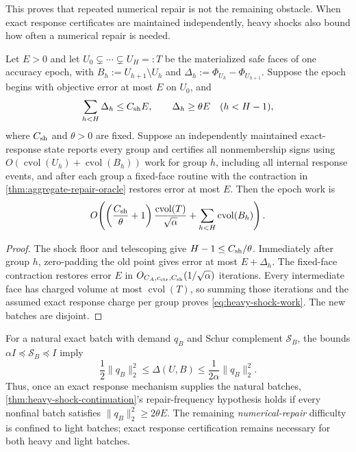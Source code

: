 This proves that repeated numerical repair is not the remaining obstacle.
When exact response certificates are maintained independently, heavy shocks
also bound how often a numerical repair is needed.

\begin{theorem}
\label{thm:heavy-shock-continuation}
Let $E>0$ and let
$U_0\subsetneq\cdots\subsetneq U_H=:T$ be the materialized safe faces of one
accuracy epoch, with $B_h:=U_{h+1}\setminus U_h$ and
$\Delta_h:=\Phi_{U_h}-\Phi_{U_{h+1}}$.  Suppose the epoch begins with
objective error at most $E$ on $U_0$, and
\begin{equation}
 \sum_{h<H}\Delta_h\leq C_{\rm sh}E,
 \qquad
 \Delta_h\geq\theta E\quad(h<H-1),
 \label{eq:heavy-shock-groups}
\end{equation}
where $C_{\rm sh}$ and $\theta>0$ are fixed.  Suppose an independently
maintained exact-response state reports every group and certifies all
nonmembership signs using
$O(\operatorname{cvol}(U_h)+\operatorname{cvol}(B_h))$ work for group $h$,
including all internal response events, and after each group a fixed-face
routine with the contraction in \cref{thm:aggregate-repair-oracle} restores
error at most $E$.  Then the epoch work is
\begin{equation}
 O\!\left(
  \left(\frac{C_{\rm sh}}\theta+1\right)
  \frac{\operatorname{cvol}(T)}{\sqrt\alpha}
  +\sum_{h<H}\operatorname{cvol}(B_h)
 \right).
 \label{eq:heavy-shock-work}
\end{equation}
\end{theorem}

\begin{proof}
The shock floor and telescoping give
$H-1\leq C_{\rm sh}/\theta$.  Immediately after group $h$, zero-padding the
old point gives error at most $E+\Delta_h$.  The fixed-face contraction restores
error $E$ in $O_{C_A,c_{\rm ctr},C_{\rm sh}}(1/\sqrt\alpha)$ iterations.
Every intermediate face has charged volume at most
$\operatorname{cvol}(T)$, so summing those iterations and the assumed exact
response charge per group proves \cref{eq:heavy-shock-work}.  The new batches
are disjoint.
\end{proof}

For a natural exact batch with demand $q_B$ and Schur complement
$\mathcal S_B$, the bounds
$\alpha I\preceq\mathcal S_B\preceq I$ imply
\begin{equation}
 \frac12\|q_B\|_2^2
 \leq\Delta(U,B)
 \leq\frac1{2\alpha}\|q_B\|_2^2.
 \label{eq:shock-demand-sandwich}
\end{equation}
Thus, once an exact response mechanism supplies the natural batches,
\cref{thm:heavy-shock-continuation}'s repair-frequency hypothesis holds if
every nonfinal batch satisfies $\|q_B\|_2^2\geq2\theta E$.  The remaining
\emph{numerical-repair} difficulty is confined to light batches; exact
response certification remains necessary for both heavy and light batches.


